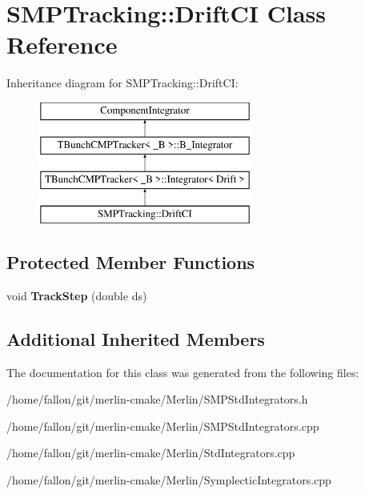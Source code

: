 \hypertarget{classSMPTracking_1_1DriftCI}{}\section{S\+M\+P\+Tracking\+:\+:Drift\+CI Class Reference}
\label{classSMPTracking_1_1DriftCI}
Inheritance diagram for S\+M\+P\+Tracking\+:\+:Drift\+CI\+:\begin{figure}[H]
\begin{center}
\leavevmode
\includegraphics[height=4.000000cm]{classSMPTracking_1_1DriftCI}
\end{center}
\end{figure}
\subsection*{Protected Member Functions}
\begin{DoxyCompactItemize}
\item 
\mbox{\label{classSMPTracking_1_1DriftCI_a03279e4909b380097b10de4ab97dc39c}} 
void {\bfseries Track\+Step} (double ds)
\end{DoxyCompactItemize}
\subsection*{Additional Inherited Members}


The documentation for this class was generated from the following files\+:\begin{DoxyCompactItemize}
\item 
/home/fallon/git/merlin-\/cmake/\+Merlin/S\+M\+P\+Std\+Integrators.\+h\item 
/home/fallon/git/merlin-\/cmake/\+Merlin/S\+M\+P\+Std\+Integrators.\+cpp\item 
/home/fallon/git/merlin-\/cmake/\+Merlin/Std\+Integrators.\+cpp\item 
/home/fallon/git/merlin-\/cmake/\+Merlin/Symplectic\+Integrators.\+cpp\end{DoxyCompactItemize}
